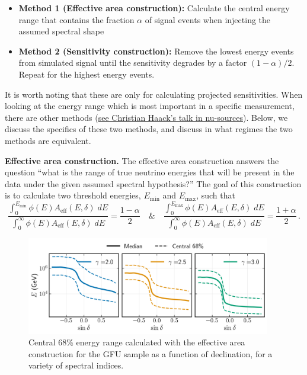 \documentclass[a4paper,11pt]{article}
\begin{document}
\begin{itemize}
    \item \textbf{Method 1 (Effective area construction):} Calculate the central energy range that contains the fraction $\alpha$ of signal events when injecting the assumed spectral shape
    \item \textbf{Method 2 (Sensitivity construction):} Remove the lowest energy events from simulated signal until the sensitivity degrades by a factor $(1-\alpha)/2$. Repeat for the highest energy events.
\end{itemize}

It is worth noting that these are only for calculating projected sensitivities. When looking at the energy range which is most important in a specific measurement, there are other methods (\href{https://drive.google.com/file/d/1UVBMbMJwyqDicMsBtyAmF3kLzf-pcnSS/view}{see Christian Haack's talk in nu-sources}). Below, we discuss the specifics of these two methods, and discuss in what regimes the two methods are equivalent.

\textbf{Effective area construction.} The effective area construction answers the question ``what is the range of true neutrino energies that will be present in the data under the given assumed spectral hypothesis?'' The goal of this construction is to calculate two threshold energies, $E_{\mathrm{min}}$ and $E_{\mathrm{max}}$, such that 
\begin{equation}
    \frac{\displaystyle\int_{0}^{E_{\mathrm{min}}}\phi(E) A_{\mathrm{eff}}(E, \delta)\; dE}{\displaystyle\int_{0}^{\infty}\phi(E) A_{\mathrm{eff}}(E, \delta)\; dE}  = \frac{1-\alpha}{2} \quad \& \quad \frac{\displaystyle\int_{0}^{E_{\mathrm{max}}}\phi(E) A_{\mathrm{eff}}(E, \delta)\; dE}{\displaystyle\int_{0}^{\infty}\phi(E) A_{\mathrm{eff}}(E, \delta)\; dE}  = \frac{1+\alpha}{2} \, .
\end{equation}

\begin{figure}
    \centering
    \includegraphics[width=0.95\textwidth]{figures/gfu_central_energies_effective_area.png}
    \caption{Central 68\% energy range calculated with the effective area construction for the GFU sample as a function of declination, for a variety of spectral indices.}
    \label{fig:central_en_eff_area_gfu}
\end{figure}
\end{document}
